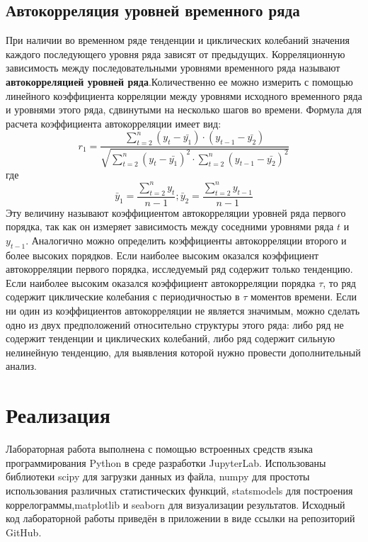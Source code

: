 \documentclass[a4paper,12pt]{article} %
\begin{document}
	\subsection{Автокорреляция уровней временного ряда}
	При наличии во временном ряде тенденции и циклических колебаний значения каждого последующего уровня ряда зависят от предыдущих. Корреляционную зависимость между последовательными уровнями временного ряда называют \textbf{автокорреляцией уровней ряда}.Количественно ее можно измерить с помощью линейного коэффициента корреляции между уровнями исходного временного ряда и уровнями этого ряда, сдвинутыми на несколько шагов во времени.
	\newline Формула для расчета коэффициента автокорреляции имеет вид:
	\begin{equation}
	r_{1}= \frac{\sum_{t=2}^{n}(y_{t} - \bar{y_{1}})\cdot (y_{t-1} - \bar{y_{2}})}{\sqrt{\sum_{t=2}^{n}(y_{t} - \bar{y_{1}})^{2}\cdot \sum_{t=2}^{n}(y_{t-1} - \bar{y_{2}})^{2}}}
	\end{equation}
	где 
	\begin{equation}
	\bar{y}_{1}=\frac{\sum_{t=2}^{n}y_{t}}{n-1};\bar{y}_{2}=\frac{\sum_{t=2}^{n}y_{t-1}}{n-1}
	\end{equation}
	Эту величину называют коэффициентом автокорреляции уровней ряда первого порядка, так как он измеряет зависимость между соседними уровнями ряда $t$ и $y_{t-1}$.
	Аналогично можно определить коэффициенты автокорреляции второго и более высоких порядков.
	\newline Если наиболее высоким оказался коэффициент автокорреляции первого порядка, исследуемый ряд содержит только тенденцию. Если наиболее высоким оказался коэффициент автокорреляции порядка $\tau $, то ряд содержит циклические колебания с периодичностью в $\tau $ моментов времени. Если ни один из коэффициентов автокорреляции не является значимым, можно сделать одно из двух предположений относительно структуры этого ряда: либо ряд не содержит тенденции и циклических колебаний, либо ряд содержит сильную нелинейную тенденцию, для выявления которой нужно провести дополнительный анализ. 
	\section{Реализация}
	Лабораторная работа выполнена с помощью встроенных средств языка программирования Python в среде разработки JupyterLab. Использованы библиотеки scipy для загрузки данных из файла, numpy для простоты использования различных статистических функций, statsmodels для построения коррелограммы,matplotlib и seaborn для визуализации результатов.
	Исходный код лабораторной работы приведён в приложении в виде ссылки на репозиторий GitHub.
\end{document}
